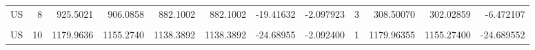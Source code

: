 \begin{table}
\begin{tabular}[t]{lrrrrrrrrrrr}
US & 8 & 925.5021 & 906.0858 & 882.1002 & 882.1002 & -19.41632 & -2.097923 & 3 & 308.50070 & 302.02859 & -6.472107\\
\cellcolor{gray!10}{US} & \cellcolor{gray!10}{9} & \cellcolor{gray!10}{952.2624} & \cellcolor{gray!10}{939.1430} & \cellcolor{gray!10}{912.1560} & \cellcolor{gray!10}{912.1560} & \cellcolor{gray!10}{-13.11936} & \cellcolor{gray!10}{-1.377704} & \cellcolor{gray!10}{2} & \cellcolor{gray!10}{476.13119} & \cellcolor{gray!10}{469.57151} & \cellcolor{gray!10}{-6.559680}\\
US & 10 & 1179.9636 & 1155.2740 & 1138.3892 & 1138.3892 & -24.68955 & -2.092400 & 1 & 1179.96355 & 1155.27400 & -24.689552\\
\bottomrule
\end{tabular}
\end{table}

